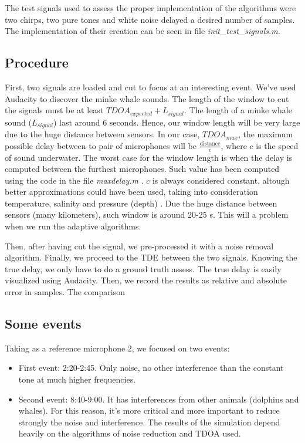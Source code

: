   The test signals used to assess the proper implementation of the algorithms were two chirps, two pure tones and white noise delayed a desired number of samples. The implementation of their creation can be seen in file \emph{init\_test\_signals.m}\cite{inittestsignals.m}.
  
\subsection{Procedure}
  First, two signals are loaded and cut to focus at an interesting event. We've used Audacity to discover the minke whale sounds. The length of the window to cut the signals must be at least $TDOA_{expected}+L_{signal}$. The length of a minke whale sound ($L_{signal}$) last around 6 seconds. Hence, our window length will be very large due to the huge distance between sensors. In our case, $TDOA_{max}$, the maximum possible delay between to pair of microphones will be $\frac{\text{distance}}{c}$, where $c$ is the speed of sound underwater. The worst case for the window length is when the delay is computed between the furthest microphones. Such value has been computed using the code in the file \emph{maxdelay.m} \cite{maxdelay.m}. $c$ is always considered constant, altough better approximations could have been used, taking into consideration temperature, salinity and pressure (depth) \cite{speed-sound-seawater}. Due the huge distance between sensors (many kilometers), such window is around 20-25 s. This will a problem when we run the adaptive algorithms.

  Then, after having cut the signal, we pre-processed it with a noise removal algorithm. Finally, we proceed to the TDE between the two signals. Knowing the true delay, we only have to do a ground truth assess. The true delay is easily visualized using Audacity. Then, we record the results as relative and absolute error in samples. The comparison 

\subsection{Some events}
  Taking as a reference microphone 2, we focused on two events:
  \begin{itemize}
    \item First event: 2:20-2:45. Only noise, no other interference than the constant tone at much higher frequencies.
    \item Second event: 8:40-9:00. It has interferences from other animals (dolphins and whales). For this reason, it's more critical and more important to reduce strongly the noise and interference. The results of the simulation depend heavily on the algorithms of noise reduction and TDOA used.
  \end{itemize}
